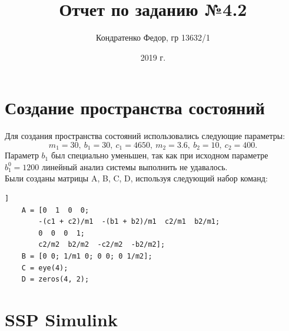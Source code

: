 \documentclass{article}
\date{2019 г.}
\author{Кондратенко Федор, гр 13632/1}
\title{Отчет по заданию №4.2}
\begin{document}
	\maketitle
	\section*{Создание пространства состояний}
	Для создания пространства состояний использовались следующие параметры:
	$$m_1 = 30,\ b_1 = 30,\ c_1 = 4650,\ m_2 = 3.6,\ b_2 = 10,\ c_2 = 400.$$
	Параметр $b_1$ был специально уменьшен, так как при исходном параметре $b^0_1=1200$ линейный анализ системы выполнить не удавалось.\\
	Были созданы матрицы A, B, C, D, используя следующий набор команд:
	\lstset{frameround=fttt}
	\begin{lstlisting}[firstnumber=1, frame=trBL, firstnumber=1,label=some-code,caption=Создание матриц для пространства состояний]]
	A = [0  1  0  0;
		-(c1 + c2)/m1  -(b1 + b2)/m1  c2/m1  b2/m1;
	  	0  0  0  1;
	  	c2/m2  b2/m2  -c2/m2  -b2/m2];
	B = [0 0; 1/m1 0; 0 0; 0 1/m2];
	C = eye(4);
	D = zeros(4, 2);
	\end{lstlisting}
	\section*{SSP Simulink}
\end{document}
